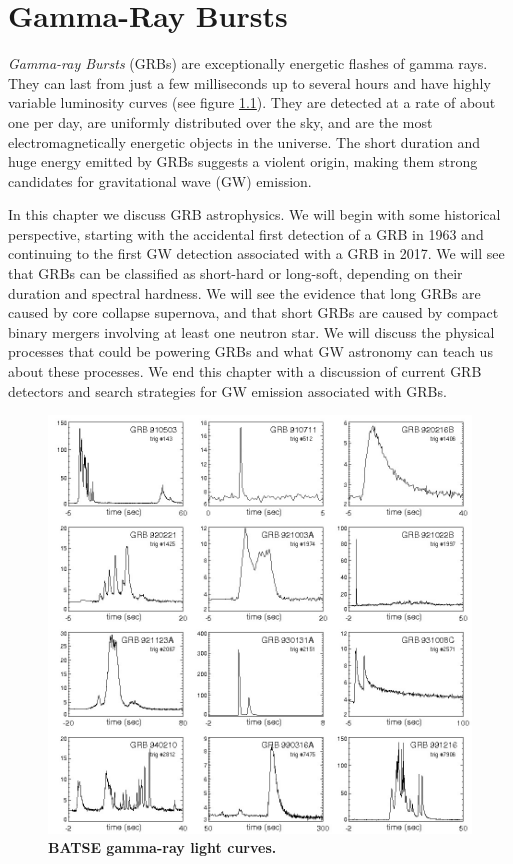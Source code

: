 \documentclass[11pt]{cuthesis}
\begin{document}
\chapter{Gamma-Ray Bursts} \label{chap:GRBs}
\textit{Gamma-ray Bursts} (GRBs) are exceptionally energetic flashes of gamma rays. They can last from just a few milliseconds up to several hours and have highly variable luminosity curves (see figure \ref{fig:grb lightcurves}). They are detected at a rate of about one per day, are uniformly distributed over the sky, and are the most electromagnetically energetic objects in the universe. The short duration and huge energy emitted by GRBs suggests a violent origin, making them strong candidates for gravitational wave (GW) emission.

In this chapter we discuss GRB astrophysics. We will begin with some historical perspective, starting with the accidental first detection of a GRB in 1963 and continuing to the first GW detection associated with a GRB in 2017. We will see that GRBs can be classified as short-hard or long-soft, depending on their duration and spectral hardness. We will see the evidence that long GRBs are caused by core collapse supernova, and that short GRBs are caused by compact binary mergers involving at least one neutron star. We will discuss the physical processes that could be powering GRBs and what GW astronomy can teach us about these processes. We end this chapter with a discussion of current GRB detectors and search strategies for GW emission associated with GRBs.

\begin{figure} %
\begin{center}
\includegraphics[width=1.0\linewidth]{grb_lightcurves.png}
\end{center}
\caption{\textbf{BATSE gamma-ray light curves.} \cite{GRBprompt} } 
\label{fig:grb lightcurves}
\end{figure}
\end{document}
